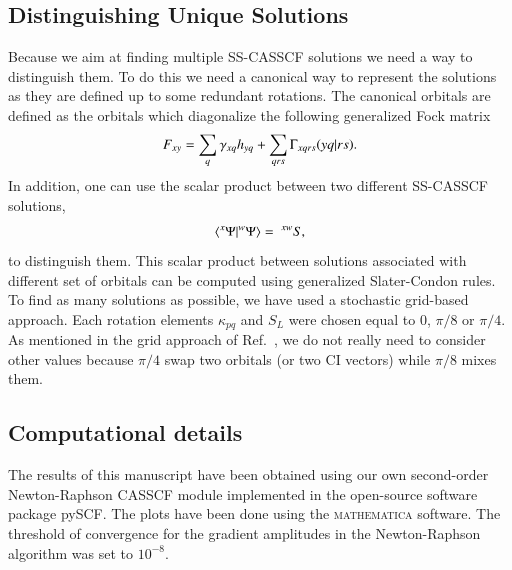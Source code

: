 \documentclass[aip,jcp,reprint,noshowkeys,superscriptaddress]{revtex4-1}
\begin{document}
\subsection{Distinguishing Unique Solutions}
\label{subsec:distinguishSolutions}

Because we aim at finding multiple SS-CASSCF solutions we need a way to distinguish them.
To do this we need a canonical way to represent the solutions as they are defined up to some redundant rotations. \cite{Helgaker_2000}
The canonical orbitals are defined as the orbitals which diagonalize the following generalized Fock matrix
\begin{equation}
  \label{eq:general_fock}
  F_{xy} = \sum_q \gamma_{xq}h_{yq} + \sum_{qrs} \Gamma_{xqrs}\ceri{yq}{rs}.
\end{equation}
In addition, one can use the scalar product between two different SS-CASSCF solutions,
\begin{equation}
  \label{eq:scalprod}
  \braket{^x\Psi}{^w\Psi} =~^{xw}S,
\end{equation}
to distinguish them.
This scalar product between solutions associated with different set of orbitals can be computed using generalized Slater-Condon rules. \cite{Burton_2021a}
To find as many solutions as possible, we have used a stochastic grid-based approach.
Each rotation elements $\kappa_{pq}$ and $S_{L}$ were chosen equal to $0$, $\pi/8$ or $\pi/4$.
As mentioned in the grid approach of Ref.~, we do not really need to consider other values because $\pi/4$ swap two orbitals (or two CI vectors) while $\pi/8$ mixes them.

\subsection{Computational details}
\label{subsec:comp_details}

The results of this manuscript have been obtained using our own second-order Newton-Raphson CASSCF module implemented in the open-source software package pySCF. \cite{Sun_2020}
The plots have been done using the \textsc{mathematica} software. \cite{Mathematica}
The threshold of convergence for the gradient amplitudes in the Newton-Raphson algorithm was set to $10^{-8}$.
\end{document}
